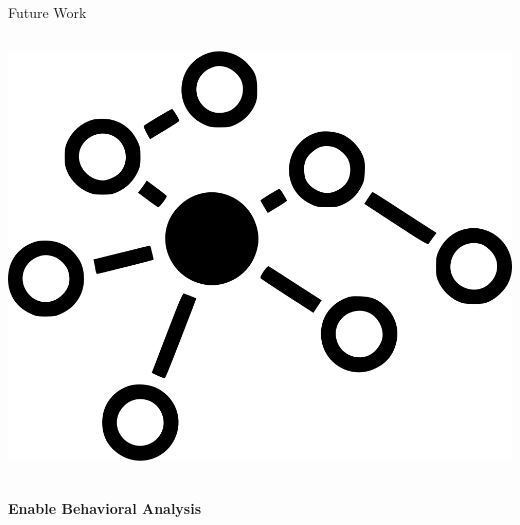 \documentclass[serif]{beamer}  %
\begin{document}
\begin{frame}{Future Work}
\begin{columns}[T,totalwidth=\textwidth]
        \begin{column}{0.32\textwidth}
            \centering
            \vspace{1em}
            \includegraphics[width=0.6\linewidth]{images/graph_icon.png}
            \vspace{1em}
            \parbox{\linewidth}{\centering\textbf{\\Enable Behavioral Analysis}}
        \end{column}
        
    \end{columns}
    
\end{frame}



\end{document}
